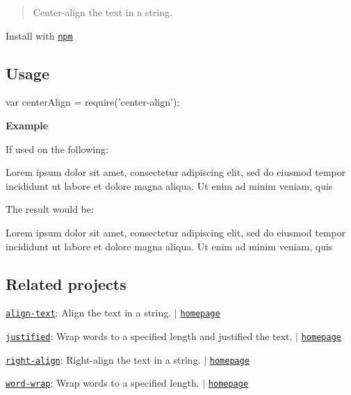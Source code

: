 \begin{quote}
Center-\/align the text in a string. \end{quote}


Install with \href{https://www.npmjs.com/}{\tt npm}




\subsection*{Usage}


\begin{DoxyCode}
var centerAlign = require('center-align');
\end{DoxyCode}


{\bfseries Example}

If used on the following\+:


\begin{DoxyCode}
Lorem ipsum dolor sit amet,
consectetur adipiscing
elit, sed do eiusmod tempor incididunt
ut labore et dolore
magna aliqua. Ut enim ad minim
veniam, quis
\end{DoxyCode}


The result would be\+:


\begin{DoxyCode}
     Lorem ipsum dolor sit amet,
        consectetur adipiscing
elit, sed do eiusmod tempor incididunt
         ut labore et dolore
    magna aliqua. Ut enim ad minim
             veniam, quis
\end{DoxyCode}


\subsection*{Related projects}


\begin{DoxyItemize}
\item \href{https://www.npmjs.com/package/align-text}{\tt align-\/text}\+: Align the text in a string. $\vert$ \href{https://github.com/jonschlinkert/align-text}{\tt homepage}
\item \href{https://www.npmjs.com/package/justified}{\tt justified}\+: Wrap words to a specified length and justified the text. $\vert$ \href{https://github.com/jonschlinkert/justified}{\tt homepage}
\item \href{https://www.npmjs.com/package/right-align}{\tt right-\/align}\+: Right-\/align the text in a string. $\vert$ \href{https://github.com/jonschlinkert/right-align}{\tt homepage}
\item \href{https://www.npmjs.com/package/word-wrap}{\tt word-\/wrap}\+: Wrap words to a specified length. $\vert$ \href{https://github.com/jonschlinkert/word-wrap}{\tt homepage}
\end{DoxyItemize}

